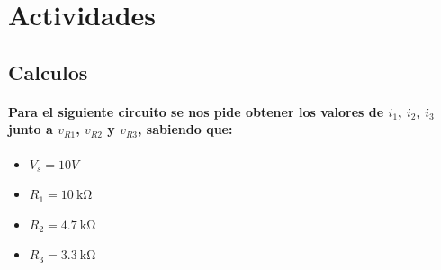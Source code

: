 \documentclass[a4paper,12pt]{article}
\begin{document}
\hfill
\begin{minipage}[t]{0.23\textwidth}
\end{minipage}

\section{Actividades}
\subsection{Calculos}
\paragraph{Para el siguiente circuito se nos pide obtener los valores de $i_1$, $i_2$, $i_3$ junto a $v_{R1}$, $v_{R2}$ y $v_{R3}$,  sabiendo que:}
\begin{itemize}
    \item $V_s = 10V$
    \item $R_1= \SI{10}{\kilo\ohm}$
    \item $R_2= \SI{4.7}{\kilo\ohm}$
    \item $R_3= \SI{3.3}{\kilo\ohm}$
\end{itemize}
\end{document}
